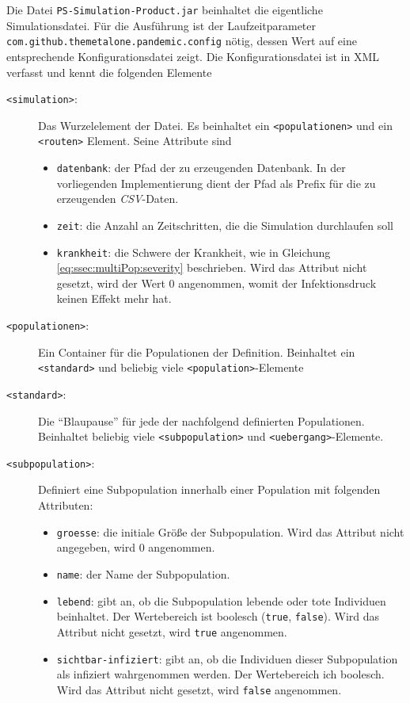 Die Datei \texttt{PS-Simulation-Product.jar} beinhaltet die eigentliche Simulationsdatei. Für die Ausführung ist der Laufzeitparameter \texttt{com.github.themetalone.pandemic.config} nötig, dessen Wert auf eine entsprechende Konfigurationsdatei zeigt. Die Konfigurationsdatei ist in XML verfasst und kennt die folgenden Elemente
\begin{description}
\item[\texttt{<simulation>}:] Das Wurzelelement der Datei. Es beinhaltet ein \texttt{<populationen>} und ein \texttt{<routen>} Element. Seine Attribute sind \begin{itemize}
	\item \texttt{datenbank}: der Pfad der zu erzeugenden Datenbank. In der vorliegenden Implementierung dient der Pfad als Prefix für die zu erzeugenden \emph{CSV}-Daten. 
	\item \texttt{zeit}: die Anzahl an Zeitschritten, die die Simulation durchlaufen soll
	\item \texttt{krankheit}: die Schwere der Krankheit, wie in Gleichung \ref{eq:ssec:multiPop:severity} beschrieben. Wird das Attribut nicht gesetzt, wird der Wert $0$ angenommen, womit der Infektionsdruck keinen Effekt mehr hat.
\end{itemize}
\item[\texttt{<populationen>}:] Ein Container für die Populationen der Definition. Beinhaltet ein \texttt{<standard>} und beliebig viele \texttt{<population>}-Elemente
\item[\texttt{<standard>}:] Die ``Blaupause'' für jede der nachfolgend definierten Populationen. Beinhaltet beliebig viele \texttt{<subpopulation>} und \texttt{<uebergang>}-Elemente. 
\item[\texttt{<subpopulation>}:] Definiert eine Subpopulation innerhalb einer Population mit folgenden Attributen:\begin{itemize}
\item \texttt{groesse}: die initiale Größe der Subpopulation. Wird das Attribut nicht angegeben, wird $0$ angenommen.
\item \texttt{name}: der Name der Subpopulation. 
\item \texttt{lebend}: gibt an, ob die Subpopulation lebende oder tote Individuen beinhaltet. Der Wertebereich ist boolesch (\texttt{true}, \texttt{false}). Wird das Attribut nicht gesetzt, wird \texttt{true} angenommen.
\item \texttt{sichtbar-infiziert}: gibt an, ob die Individuen dieser Subpopulation als infiziert wahrgenommen werden. Der Wertebereich ich boolesch. Wird das Attribut nicht gesetzt, wird \texttt{false} angenommen.

\end{itemize}
\end{description}
